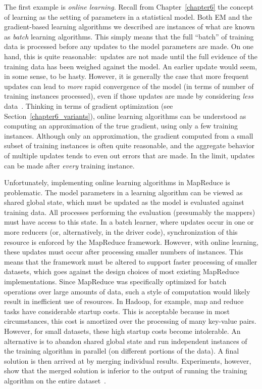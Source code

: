 The first example is {\it online learning}.  Recall from
Chapter~\ref{chapter6} the concept of learning as the setting of
parameters in a statistical model.  Both EM and the gradient-based
learning algorithms we described are instances of what are known as
\emph{batch} learning algorithms.  This simply means that the full
``batch'' of training data is processed before any updates to the
model parameters are made.  On one hand, this is quite
reasonable:\ updates are not made until the full evidence of the
training data has been weighed against the model.  An earlier update
would seem, in some sense, to be hasty.  However, it is generally the
case that more frequent updates can lead to \emph{more} rapid
convergence of the model (in terms of number of training instances
processed), even if those updates are made by considering \emph{less}
data~\cite{Bottou_2004}.  Thinking in terms of gradient optimization
(see Section~\ref{chapter6_variants}), online learning algorithms can
be understood as computing an approximation of the true gradient,
using only a few training instances.  Although only an approximation,
the gradient computed from a small subset of training instances is
often quite reasonable, and the aggregate behavior of multiple updates
tends to even out errors that are made.  In the limit, updates can be
made after \emph{every} training instance.

Unfortunately, implementing online learning algorithms in MapReduce is
problematic.  The model parameters in a learning algorithm can be
viewed as shared global state, which must be updated as the model is
evaluated against training data.  All processes performing the
evaluation (presumably the mappers) must have access to this state.
In a batch learner, where updates occur in one or more reducers (or,
alternatively, in the driver code), synchronization of this resource
is enforced by the MapReduce framework.  However, with online
learning, these updates must occur after processing smaller numbers of
instances.  This means that the framework must be altered to support
faster processing of smaller datasets, which goes against the design
choices of most existing MapReduce implementations.  Since MapReduce
was specifically optimized for batch operations over large amounts of
data, such a style of computation would likely result in inefficient
use of resources.  In Hadoop, for example, map and reduce tasks have
considerable startup costs.  This is acceptable because in most
circumstances, this cost is amortized over the processing of many
key-value pairs.  However, for small datasets, these high startup
costs become intolerable.  An alternative is to abandon shared global
state and run independent instances of the training algorithm in
parallel (on different portions of the data).  A final solution is
then arrived at by merging individual results.  Experiments, however,
show that the merged solution is inferior to the output of running the
training algorithm on the entire dataset~\cite{Dredze_etal_2009}.

